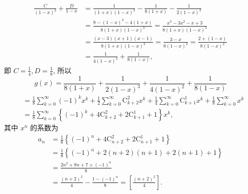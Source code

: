 $$
\begin{aligned}
\frac{C}{(1-x)^2}+\frac{D}{1-x} & =\frac{1}{(1+x)(1-x)^3}-\frac{1}{8(1+x)}-\frac{1}{2(1-x)^3} \\
& =\frac{8-(1-x)^3-4(1+x)}{8(1+x)(1-x)^3}=\frac{x^3-3 x^2-x+3}{8(1+x)(1-x)^3} \\
& =\frac{(x-3)(x+1)(x-1)}{8(1+x)(1-x)^3}=\frac{3-x}{8(1-x)^2}=\frac{2+(1-x)}{8(1-x)^2} \\
& =\frac{1}{4(1-x)^2}+\frac{1}{8(1-x)},
\end{aligned}
$$
即 $C=\frac{1}{4}, D=\frac{1}{8}$, 所以
$$
g(x)=\frac{1}{8(1+x)}+\frac{1}{2(1-x)^3}+\frac{1}{4(1-x)^2}+\frac{1}{8(1-x)}
$$
$$
\begin{aligned}
& =\frac{1}{8} \sum_{k=0}^{\infty}(-1)^k x^k+\frac{1}{2} \sum_{k=0}^{\infty} \mathrm{C}_{k+2}^2 x^k+\frac{1}{4} \sum_{k=0}^{\infty} \mathrm{C}_{k+1}^1 x^k+\frac{1}{8} \sum_{k=0}^{\infty} x^k \\
& =\frac{1}{8} \sum_{k=0}^{\infty}\left\{(-1)^k+4 \mathrm{C}_{k+2}^2+2 \mathrm{C}_{k+1}^1+1\right\} x^k,
\end{aligned}
$$
其中 $x^n$ 的系数为
$$
\begin{aligned}
a_n & =\frac{1}{8}\left\{(-1)^n+4 \mathrm{C}_{n+2}^2+2 \mathrm{C}_{n+1}^1+1\right\} \\
& =\frac{1}{8}\left\{(-1)^n+2(n+2)(n+1)+2(n+1)+1\right\} \\
& =\frac{2 n^2+8 n+7+(-1)^n}{8} \\
& =\frac{(n+2)^2}{4}-\frac{1-(-1)^n}{8}=\left[\frac{(n+2)^2}{4}\right] .
\end{aligned}
$$



